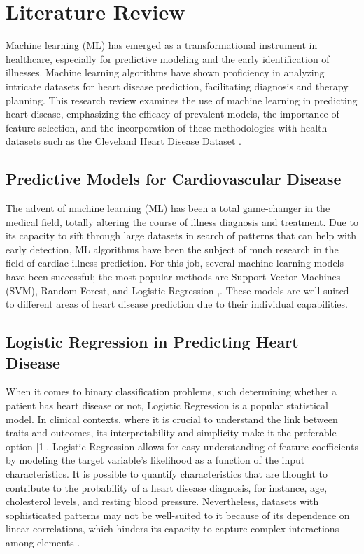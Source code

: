 \section{Literature Review}

Machine learning (ML) has emerged as a transformational instrument in healthcare, especially for predictive modeling and the early identification of illnesses. Machine learning algorithms have shown proficiency in analyzing intricate datasets for heart disease prediction, facilitating diagnosis and therapy planning. This research review examines the use of machine learning in predicting heart disease, emphasizing the efficacy of prevalent models, the importance of feature selection, and the incorporation of these methodologies with health datasets such as the Cleveland Heart Disease Dataset \cite{battineni2020diagnosis}.

\subsection{Predictive Models for Cardiovascular Disease}

The advent of machine learning (ML) has been a total game-changer in the medical field, totally altering the course of illness diagnosis and treatment. Due to its capacity to sift through large datasets in search of patterns that can help with early detection, ML algorithms have been the subject of much research in the field of cardiac illness prediction. For this job, several machine learning models have been successful; the most popular methods are Support Vector Machines (SVM), Random Forest, and Logistic Regression \cite{zhou2021machine},\cite{ren2017forest}. These models are well-suited to different areas of heart disease prediction due to their individual capabilities.

\subsection{Logistic Regression in Predicting Heart Disease}
When it comes to binary classification problems, such determining whether a patient has heart disease or not, Logistic Regression is a popular statistical model. In clinical contexts, where it is crucial to understand the link between traits and outcomes, its interpretability and simplicity make it the preferable option [1]\cite{battineni2020diagnosis}. Logistic Regression allows for easy understanding of feature coefficients by modeling the target variable's likelihood as a function of the input characteristics. It is possible to quantify characteristics that are thought to contribute to the probability of a heart disease diagnosis, for instance, age, cholesterol levels, and resting blood pressure. Nevertheless, datasets with sophisticated patterns may not be well-suited to it because of its dependence on linear correlations, which hinders its capacity to capture complex interactions among elements \cite{zhou2021machine}.

